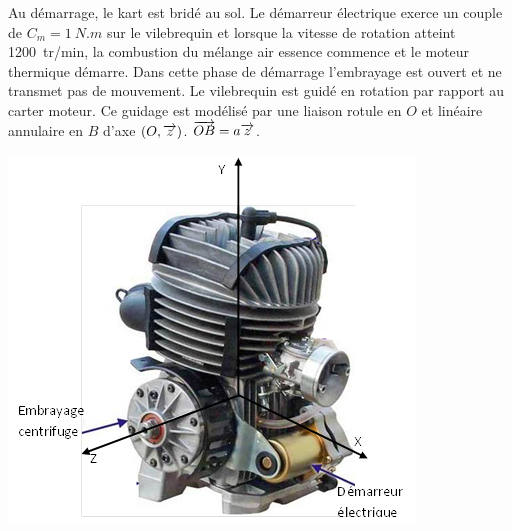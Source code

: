 \documentclass[10pt,fleqn]{article} %
\begin{document}
\def\pathfig{images}

\vspace{5cm}
\pagestyle{fancy}
\thispagestyle{plain}

\def\columnseprulecolor{\color{ocre}}
\setlength{\columnseprule}{0.4pt} 

\def\pathfig{images}

\ifprof
\else
\begin{multicols}{2}
\fi


Au démarrage, le kart est bridé au sol. Le démarreur électrique exerce un couple de $C_m = \SI{1}{N.m}$ sur le vilebrequin et lorsque la vitesse de rotation atteint \SI{1200}{tr/min}, la combustion du mélange air essence commence et le moteur thermique démarre. Dans cette phase de démarrage l’embrayage est ouvert et ne transmet pas de mouvement.
Le vilebrequin est guidé en rotation par rapport au carter moteur. Ce guidage est modélisé par une liaison rotule en $O$ et linéaire annulaire en $B$ d’axe $\left(O,\overrightarrow{z}\right)$. $\overrightarrow{OB}=a\overrightarrow{z}$.


\begin{center}
\includegraphics[width=\linewidth]{images/fig_01}
\end{center}


\end{multicols}
\end{document}
